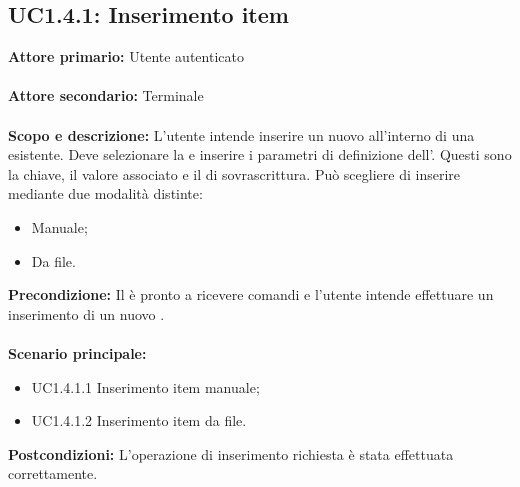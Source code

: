 \documentclass{scalatekids-article}
\begin{document}
\subsection{UC1.4.1: Inserimento item}

\textbf{Attore primario:} Utente autenticato\\ \\
\textbf{Attore secondario:} Terminale\\ \\
\textbf{Scopo e descrizione:} L'utente intende inserire un nuovo  all'interno di una  esistente. Deve selezionare la  e inserire i parametri di definizione dell'. Questi sono la chiave, il valore associato e il  di sovrascrittura. Può scegliere di inserire mediante due modalità distinte:
\begin{itemize}
  \item Manuale;
  \item Da file.
\end{itemize}
\textbf{Precondizione:} Il  è pronto a ricevere comandi e l'utente intende effettuare un inserimento di un nuovo .\\ \\
\textbf{Scenario principale:}
\begin{itemize}
  \item UC1.4.1.1 Inserimento item manuale;
  \item UC1.4.1.2 Inserimento item da file.
\end{itemize}
\textbf{Postcondizioni:} L'operazione di inserimento richiesta è stata effettuata correttamente.
\end{document}

